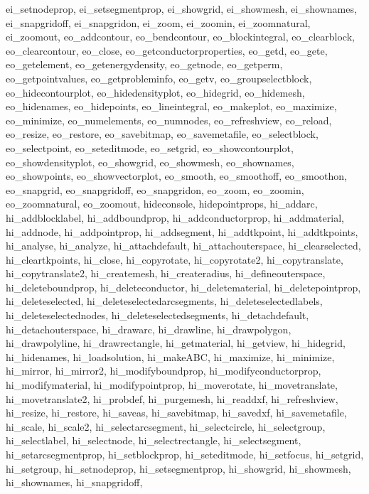 {{ei_setnodeprop, 
ei_setsegmentprop, 
ei_showgrid, 
ei_showmesh, 
ei_shownames, 
ei_snapgridoff, 
ei_snapgridon, 
ei_zoom, 
ei_zoomin, 
ei_zoomnatural, 
ei_zoomout, 
eo_addcontour, 
eo_bendcontour, 
eo_blockintegral, 
eo_clearblock, 
eo_clearcontour, 
eo_close, 
eo_getconductorproperties, 
eo_getd, 
eo_gete, 
eo_getelement, 
eo_getenergydensity, 
eo_getnode, 
eo_getperm, 
eo_getpointvalues, 
eo_getprobleminfo, 
eo_getv, 
eo_groupselectblock, 
eo_hidecontourplot, 
eo_hidedensityplot, 
eo_hidegrid, 
eo_hidemesh, 
eo_hidenames, 
eo_hidepoints, 
eo_lineintegral, 
eo_makeplot, 
eo_maximize, 
eo_minimize, 
eo_numelements, 
eo_numnodes, 
eo_refreshview, 
eo_reload, 
eo_resize, 
eo_restore, 
eo_savebitmap, 
eo_savemetafile, 
eo_selectblock, 
eo_selectpoint, 
eo_seteditmode, 
eo_setgrid, 
eo_showcontourplot, 
eo_showdensityplot, 
eo_showgrid, 
eo_showmesh, 
eo_shownames, 
eo_showpoints, 
eo_showvectorplot, 
eo_smooth, 
eo_smoothoff, 
eo_smoothon, 
eo_snapgrid, 
eo_snapgridoff, 
eo_snapgridon, 
eo_zoom, 
eo_zoomin, 
eo_zoomnatural, 
eo_zoomout, 
hideconsole, 
hidepointprops, 
hi_addarc, 
hi_addblocklabel, 
hi_addboundprop, 
hi_addconductorprop, 
hi_addmaterial, 
hi_addnode, 
hi_addpointprop, 
hi_addsegment, 
hi_addtkpoint, 
hi_addtkpoints, 
hi_analyse, 
hi_analyze, 
hi_attachdefault, 
hi_attachouterspace, 
hi_clearselected, 
hi_cleartkpoints, 
hi_close, 
hi_copyrotate, 
hi_copyrotate2, 
hi_copytranslate, 
hi_copytranslate2, 
hi_createmesh, 
hi_createradius, 
hi_defineouterspace, 
hi_deleteboundprop, 
hi_deleteconductor, 
hi_deletematerial, 
hi_deletepointprop, 
hi_deleteselected, 
hi_deleteselectedarcsegments, 
hi_deleteselectedlabels, 
hi_deleteselectednodes, 
hi_deleteselectedsegments, 
hi_detachdefault, 
hi_detachouterspace, 
hi_drawarc, 
hi_drawline, 
hi_drawpolygon, 
hi_drawpolyline, 
hi_drawrectangle, 
hi_getmaterial, 
hi_getview, 
hi_hidegrid, 
hi_hidenames, 
hi_loadsolution, 
hi_makeABC, 
hi_maximize, 
hi_minimize, 
hi_mirror, 
hi_mirror2, 
hi_modifyboundprop, 
hi_modifyconductorprop, 
hi_modifymaterial, 
hi_modifypointprop, 
hi_moverotate, 
hi_movetranslate, 
hi_movetranslate2, 
hi_probdef, 
hi_purgemesh, 
hi_readdxf, 
hi_refreshview, 
hi_resize, 
hi_restore, 
hi_saveas, 
hi_savebitmap, 
hi_savedxf, 
hi_savemetafile, 
hi_scale, 
hi_scale2, 
hi_selectarcsegment, 
hi_selectcircle, 
hi_selectgroup, 
hi_selectlabel, 
hi_selectnode, 
hi_selectrectangle, 
hi_selectsegment, 
hi_setarcsegmentprop, 
hi_setblockprop, 
hi_seteditmode, 
hi_setfocus, 
hi_setgrid, 
hi_setgroup, 
hi_setnodeprop, 
hi_setsegmentprop, 
hi_showgrid, 
hi_showmesh, 
hi_shownames, 
hi_snapgridoff, 
}}
